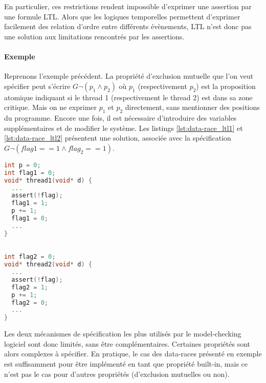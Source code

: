 En particulier, ces restrictions rendent impossible d'exprimer une assertion par
une formule \ac{LTL}. Alors que les logiques temporelles permettent d'exprimer
facilement des relation d'ordre entre différents évènements, \ac{LTL} n'est donc
pas une solution aux limitations rencontrés par les assertions.

\paragraph{Exemple}
Reprenons l'exemple précédent. La propriété d'exclusion mutuelle que l'on veut
spécifier peut s'écrire \(G \lnot (p_1 \land p_2)\) où \(p_1\) (respectivement
\(p_2\)) est la proposition atomique indiquant si le thread 1 (respectivement le
thread 2) est dans sa zone critique. Mais on ne exprimer \(p_1\) et \(p_2\)
directement, sans mentionner des positions du programme. Encore une fois, il est
nécessaire d'introduire des variables supplémentaires et de modifier le système.
Les listings \ref{lst:data-race_ltl1} et \ref{lst:data-race_ltl2} présentent une
solution, associée avec la spécification \(G \lnot (flag1 == 1 \land flag_2 ==
1)\).

\noindent\begin{minipage}{.45\textwidth}
  \begin{lstlisting}[language=C, frame=single, caption=Thread 1,
    label=lst:data-race_ltl1]
int p = 0;
int flag1 = 0;
void* thread1(void* d) {
  ...
  assert(!flag);
  flag1 = 1;
  p += 1;
  flag1 = 0;
  ...
}
\end{lstlisting}
\end{minipage}\hfill
\begin{minipage}{.45\textwidth}
\begin{lstlisting}[language=C, frame=single, caption=Thread 2,
    label=lst:data-race_ltl2]

int flag2 = 0;
void* thread2(void* d) {
  ...
  assert(!flag);
  flag2 = 1;
  p += 1;
  flag2 = 0;
  ...
}
\end{lstlisting}
\end{minipage}

Les deux mécanismes de spécification les plus utilisés par le model-checking
logiciel sont donc limités, sans être complémentaires. Certaines propriétés sont
alors complexes à spécifier. En pratique, le cas des data-races présenté en
exemple est suffisamment pour être implémenté en tant que propriété built-in,
mais ce n'est pas le cas pour d'autres propriétés (d'exclusion mutuelles ou non).

